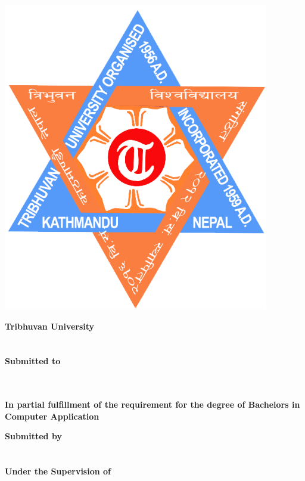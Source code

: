 \begin{center}
\begin{spacing}{1.6}
\thispagestyle{empty}

\includegraphics[scale=0.25]{img/Graphics/TUlogo.png}

\textbf{
\large{Tribhuvan University}\\
\large{\theinstitute}}\\
\vspace{0.5cm}
\textbf{\MakeUppercase{\thetitle}\\
\vspace{0.5cm} 
Submitted to\\ 
\thedepartment\\
\thecampus}\\
\vspace{0.5cm}

\textbf{In partial fulfillment of the requirement for the degree of Bachelors in Computer Application}
\bigskip

\par

\textbf{
Submitted by\\
\theauthor\\
\MakeUppercase{\thedate}}\\
\vspace{1cm}
\textbf{
Under the Supervision of\\
\thesupervisor
}
\end{spacing}
\end{center}

\clearpage